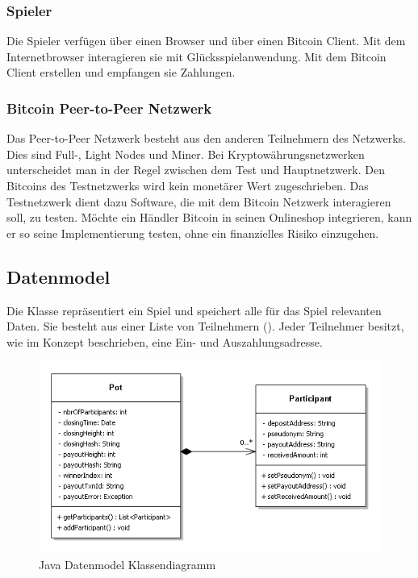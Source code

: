 \subsubsection{Spieler}
Die Spieler verfügen über einen Browser und über einen Bitcoin Client.
Mit dem Internetbrowser interagieren sie mit Glücksspielanwendung. Mit dem Bitcoin Client erstellen und empfangen sie Zahlungen.
\subsubsection{Bitcoin Peer-to-Peer Netzwerk}
Das Peer-to-Peer Netzwerk besteht aus den anderen Teilnehmern des Netzwerks. Dies sind Full-, Light Nodes und Miner. Bei Kryptowährungsnetzwerken unterscheidet man in der Regel zwischen dem Test und Hauptnetzwerk. Den Bitcoins des Testnetzwerks wird kein monetärer Wert zugeschrieben. Das Testnetzwerk dient dazu Software, die mit dem Bitcoin Netzwerk interagieren soll, zu testen. Möchte ein Händler Bitcoin in seinen Onlineshop integrieren, kann er so seine Implementierung testen, ohne ein finanzielles Risiko einzugehen. 

\subsection{Datenmodel}
Die Klasse  repräsentiert ein Spiel und speichert alle für das Spiel relevanten Daten. Sie besteht aus einer Liste von Teilnehmern (). Jeder Teilnehmer besitzt, wie im Konzept beschrieben, eine Ein- und Auszahlungsadresse.
\begin{figure}[H]
\centering
\includegraphics[width=1\linewidth]{Figures/umsetzung_btc/btc_datenmodell}
\decoRule
\caption{Java Datenmodel Klassendiagramm}
\label{fig:btc_datenmodell}
\end{figure}

